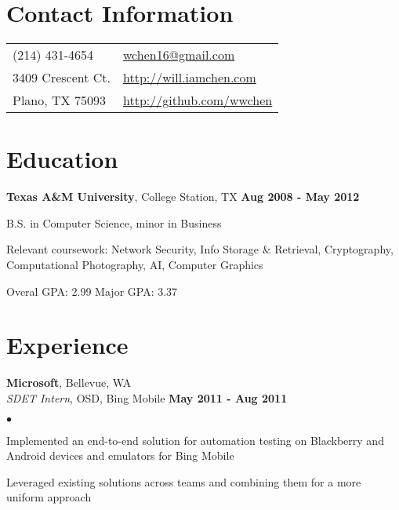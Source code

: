 \documentclass[margin,line]{res}
\newenvironment{list1}{
  \begin{list}{\ding{113}}{%
      \setlength{\itemsep}{0in}
      \setlength{\parsep}{0in} \setlength{\parskip}{0in}
      \setlength{\topsep}{0in} \setlength{\partopsep}{0in} 
      \setlength{\leftmargin}{0.17in}}}{\end{list}}
\newenvironment{list2}{
  \begin{list}{$\bullet$}{%
      \setlength{\itemsep}{0in}
      \setlength{\parsep}{0in} \setlength{\parskip}{0in}
      \setlength{\topsep}{0in} \setlength{\partopsep}{0in} 
      \setlength{\leftmargin}{0.18in}}}{\end{list}}
\begin{document}

\begin{resume}
\section{\sc Contact Information}
\vspace{.05in}
\begin{tabular}{@{}p{3in}p{4in}}
(214) 431-4654             & \href{mailto:wchen16@gmail.com}{wchen16@gmail.com} \\
3409 Crescent Ct.          & \href{http://will.iamchen.com}{http://will.iamchen.com} \\
Plano, TX 75093            & \href{http://github.com/wwchen}{http://github.com/wwchen} \\
                           
\end{tabular}

%
%
\section{\sc Education}
{\bf Texas A\&M University}, College Station, TX \hfill {\bf Aug 2008 - May 2012} \\
\vspace*{-3mm}
\begin{list1}
\item[] \hspace*{-5mm} B.S. in Computer Science, minor in Business
\item[] \hspace*{-5mm} Relevant coursework: Network Security, Info Storage \& Retrieval,
 Cryptography, Computational Photography, AI, Computer Graphics
\item[] \hspace*{-5mm} Overal GPA: 2.99 \hspace{5mm} Major GPA: 3.37
\end{list1}


%
%
\section{\sc Experience}
{\bf Microsoft}, Bellevue, WA \\
{\em SDET Intern}, OSD, Bing Mobile \hfill {\bf May 2011 - Aug 2011} \\
\vspace{-3mm}
\begin{list2}
\item Implemented an end-to-end solution for automation testing on Blackberry and Android devices 
  and emulators for Bing Mobile
\item Leveraged existing solutions across teams and combining them for a more uniform approach
\end{list2}


\end{resume}
\end{document}
